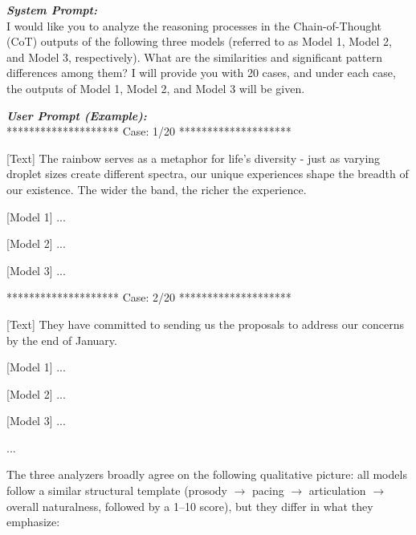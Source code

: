 \documentclass[]{bytedance_seed}
\begin{document}
\begin{promptbox}

\textit{\textbf{System Prompt:} }\\
I would like you to analyze the reasoning processes in the Chain-of-Thought (CoT) outputs of the following three models (referred to as Model 1, Model 2, and Model 3, respectively). What are the similarities and significant pattern differences among them? I will provide you with 20 cases, and under each case, the outputs of Model 1, Model 2, and Model 3 will be given.

\medskip \textit{\textbf{User Prompt (Example):} }\\

******************** Case: 1/20 ********************
\vspace{2mm}

[Text] The rainbow serves as a metaphor for life's diversity - just as varying droplet sizes create different spectra, our unique experiences shape the breadth of our existence. The wider the band, the richer the experience.

[Model 1] ...

[Model 2] ...

[Model 3] ...

\vspace{2mm}
******************** Case: 2/20 ********************
\vspace{2mm}

[Text] They have committed to sending us the proposals to address our concerns by the end of January.

[Model 1] ...

[Model 2] ...

[Model 3] ...

...

\end{promptbox}

The three analyzers broadly agree on the following qualitative picture:
all models follow a similar structural template
(prosody $\rightarrow$ pacing $\rightarrow$ articulation $\rightarrow$
overall naturalness, followed by a 1--10 score), but they differ in what they
emphasize:
\end{document}
